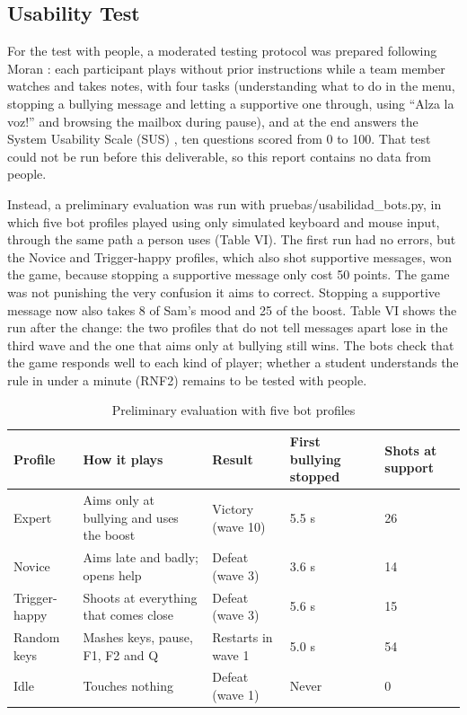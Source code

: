 \documentclass[conference]{IEEEtran}
\begin{document}
\subsection{Usability Test}

For the test with people, a moderated testing protocol was prepared following Moran \cite{ref12}: each participant plays without prior instructions while a team member watches and takes notes, with four tasks (understanding what to do in the menu, stopping a bullying message and letting a supportive one through, using ``\textexclamdown{}Alza la voz!'' and browsing the mailbox during pause), and at the end answers the System Usability Scale (SUS) \cite{ref13}, ten questions scored from 0 to 100. That test could not be run before this deliverable, so this report contains no data from people.

Instead, a preliminary evaluation was run with pruebas/usabilidad\_bots.py, in which five bot profiles played using only simulated keyboard and mouse input, through the same path a person uses (Table VI). The first run had no errors, but the Novice and Trigger-happy profiles, which also shot supportive messages, won the game, because stopping a supportive message only cost 50 points. The game was not punishing the very confusion it aims to correct. Stopping a supportive message now also takes 8 of Sam's mood and 25 of the boost. Table VI shows the run after the change: the two profiles that do not tell messages apart lose in the third wave and the one that aims only at bullying still wins. The bots check that the game responds well to each kind of player; whether a student understands the rule in under a minute (RNF2) remains to be tested with people.

\begin{table}[!htbp]
\centering
\caption{Preliminary evaluation with five bot profiles}
\footnotesize
\begin{tabularx}{\textwidth}{|l|X|X|X|X|}
\hline
\textbf{Profile} & \textbf{How it plays} & \textbf{Result} & \textbf{First bullying stopped} & \textbf{Shots at support} \\ \hline
Expert & Aims only at bullying and uses the boost & Victory (wave 10) & 5.5 s & 26 \\ \hline
Novice & Aims late and badly; opens help & Defeat (wave 3) & 3.6 s & 14 \\ \hline
Trigger-happy & Shoots at everything that comes close & Defeat (wave 3) & 5.6 s & 15 \\ \hline
Random keys & Mashes keys, pause, F1, F2 and Q & Restarts in wave 1 & 5.0 s & 54 \\ \hline
Idle & Touches nothing & Defeat (wave 1) & Never & 0 \\ \hline
\end{tabularx}
\end{table}
\end{document}
